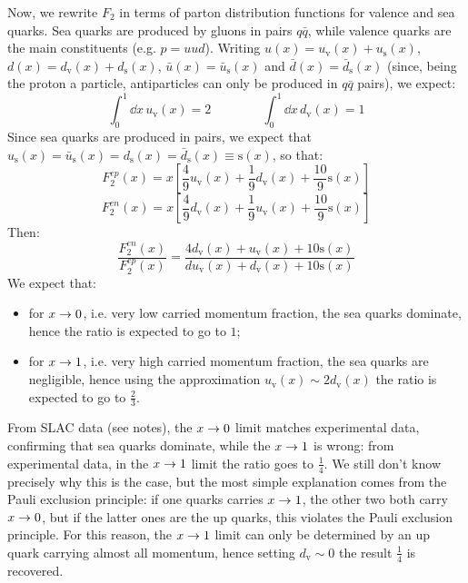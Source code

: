 Now, we rewrite $ F_2 $ in terms of parton distribution functions for valence and sea quarks. Sea quarks are produced by gluons in pairs $ q\bar{q} $, while valence quarks are the main constituents (e.g. $ p = uud $). Writing $ u(x) = u_\text{v}(x) + u_\text{s}(x) $, $ d(x) = d_\text{v}(x) + d_\text{s}(x) $, $ \bar{u}(x) = \bar{u}_\text{s}(x) $ and $ \bar{d}(x) = \bar{d}_\text{s}(x) $ (since, being the proton a particle, antiparticles can only be produced in $ q\bar{q} $ pairs), we expect:
\begin{equation*}
  \int_0^1 \dd x \, u_\text{v}(x) = 2
  \qquad \qquad
  \int_0^1 \dd x \, d_\text{v}(x) = 1
\end{equation*}
Since sea quarks are produced in pairs, we expect that $ u_\text{s}(x) = \bar{u}_\text{s}(x) = d_\text{s}(x) = \bar{d}_\text{s}(x) \equiv \text{s}(x) $, so that:
\begin{equation*}
  F_2^{ep}(x) = x \left[ \frac{4}{9} u_\text{v}(x) + \frac{1}{9} d_\text{v}(x) + \frac{10}{9} \text{s}(x) \right]
\end{equation*}
\begin{equation*}
  F_2^{en}(x) = x \left[ \frac{4}{9} d_\text{v}(x) + \frac{1}{9} u_\text{v}(x) + \frac{10}{9} \text{s}(x) \right]
\end{equation*}
Then:
\begin{equation*}
  \frac{F_2^{en}(x)}{F_2^{ep}(x)} = \frac{4 d_\text{v}(x) + u_\text{v}(x) + 10 \text{s}(x)}{d u_\text{v}(x) + d_\text{v}(x) + 10 \text{s}(x)}
\end{equation*}
We expect that:
\begin{itemize}
  \item for $ x \rightarrow 0 $, i.e. very low carried momentum fraction, the sea quarks dominate, hence the ratio is expected to go to $ 1 $;
  \item for $ x \rightarrow 1 $, i.e. very high carried momentum fraction, the sea quarks are negligible, hence using the approximation $ u_\text{v}(x) \sim 2 d_\text{v}(x) $ the ratio is expected to go to $ \frac{2}{3} $.
\end{itemize}
From SLAC data (see notes), the $ x \rightarrow 0 $ limit matches experimental data, confirming that sea quarks dominate, while the $ x \rightarrow 1 $ is wrong: from experimental data, in the $ x \rightarrow 1 $ limit the ratio goes to $ \frac{1}{4} $. We still don't know precisely why this is the case, but the most simple explanation comes from the Pauli exclusion principle: if one quarks carries $ x \rightarrow 1 $, the other two both carry $ x \rightarrow 0 $, but if the latter ones are the up quarks, this violates the Pauli exclusion principle. For this reason, the $ x \rightarrow 1 $ limit can only be determined by an up quark carrying almost all momentum, hence setting $ d_\text{v} \sim 0 $ the result $ \frac{1}{4} $ is recovered.

